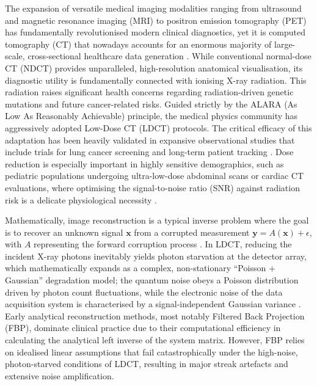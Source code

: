 The expansion of versatile medical imaging modalities ranging from ultrasound and magnetic
resonance imaging (MRI) to positron emission tomography (PET) has fundamentally
revolutionised modern clinical diagnostics, yet it is computed tomography (CT) that
nowadays accounts for an enormous majority of large-scale, cross-sectional healthcare data
generation \cite{zhao2023multitask}. While conventional normal-dose CT (NDCT) provides
unparalleled, high-resolution anatomical visualisation, its diagnostic utility is
fundamentally connected with ionising X-ray radiation. This radiation raises significant
health concerns regarding radiation-driven genetic mutations and future cancer-related
risks. Guided strictly by the ALARA (As Low As Reasonably Achievable) principle, the
medical physics community has aggressively adopted Low-Dose CT (LDCT) protocols. The
critical efficacy of this adaptation has been heavily validated in expansive observational
studies that include trials for lung cancer screening and long-term patient tracking
\cite{cao2023observational}. Dose reduction is especially important in highly sensitive
demographics, such as pediatric populations undergoing ultra-low-dose abdominal scans or
cardiac CT evaluations, where optimising the signal-to-noise ratio (SNR) against radiation
risk is a delicate physiological necessity \cite{cho2024pediatric}.

Mathematically, image reconstruction is a typical inverse problem where the goal is to
recover an unknown signal $\mathbf{x}$ from a corrupted measurement
$\mathbf{y} = A(\mathbf{x}) + \epsilon$, with $A$ representing the forward corruption
process \cite{niu2023score}. In LDCT, reducing the incident X-ray photons inevitably
yields photon starvation at the detector array, which mathematically expands as a complex,
non-stationary ``Poisson + Gaussian'' degradation model; the quantum noise obeys a Poisson
distribution driven by photon count fluctuations, while the electronic noise of the data
acquisition system is characterised by a signal-independent Gaussian variance
\cite{zhang2024review}. Early analytical reconstruction methods, most notably Filtered
Back Projection (FBP), dominate clinical practice due to their computational efficiency
in calculating the analytical left inverse of the system matrix. However, FBP relies on
idealised linear assumptions that fail catastrophically under the high-noise,
photon-starved conditions of LDCT, resulting in major streak artefacts and extensive
noise amplification.


